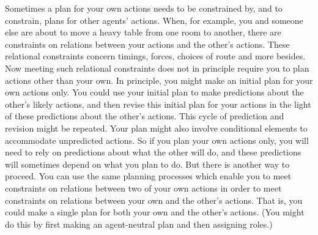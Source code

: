 \documentclass[12pt,\papersize]{extarticle}
\begin{document}
Sometimes a plan for your own actions needs to be constrained by, and to constrain, plans for other agents' actions.
When, for example,
you and someone else are about to move a heavy table from one room to another,
there are constraints 
on relations between
	your actions
	and
	the other's actions.
These relational constraints concern timings, forces, choices of route and more besides.
Now meeting such relational constraints does not in principle require you to plan actions other than your own.
In principle,  you  might make an initial plan for your own actions only.
You could use your initial plan to make predictions about the  other's likely actions,
and then revise this initial plan for your actions in the light of these predictions about the other's actions.
This cycle of prediction and revision might be repeated.
Your plan might also involve conditional elements to accommodate unpredicted actions.
So if you plan your own actions only,
 you will need to rely on predictions about what the other will do,
 and these predictions will sometimes depend on what you plan to do.
But there is another way to proceed.
You can use the same planning processes which enable you to meet constraints on relations between two of your own actions
	in order to meet constraints on relations between your own and the other's actions.
That is, you could make a single plan for both your own and the other's actions.
(You might do this by first making an agent-neutral plan and then assigning roles.)
\end{document}
